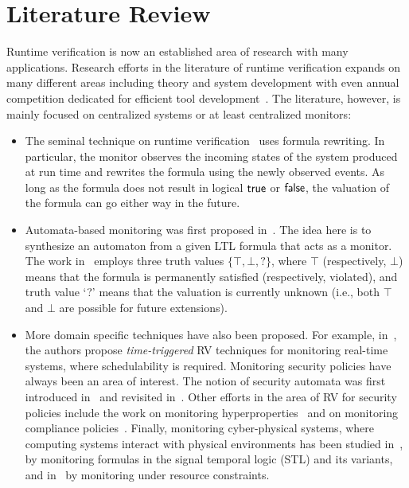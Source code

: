 \chapter{Literature Review}
\label{chap:RW}

Runtime verification is now an established area of research with many 
applications. Research efforts in the literature of runtime verification 
expands on many different areas including theory and system development 
with even annual competition dedicated for efficient tool 
development~\cite{sttt-rv}. The literature, however, is mainly focused on 
centralized systems or at least centralized monitors:

\begin{itemize}
 \item The seminal technique on runtime 
verification~\cite{hr01,hr01a,hr04,ar05,cr07,hr02} uses formula rewriting. In 
particular, the monitor observes the incoming states of the system produced at 
run time and rewrites the formula using the newly observed events. As long as 
the formula does not result in logical $\mathsf{true}$ or $\mathsf{false}$, the valuation of the 
formula can go either way in the future.

\item Automata-based monitoring was first proposed in~\cite{bls11}. The idea 
here is to synthesize an automaton from a given LTL formula that acts as a 
monitor. The work in~\cite{bls11} employs three truth values $\{\top, \bot, 
?\}$, where $\top$ (respectively, $\bot$) means that the formula is permanently 
satisfied (respectively, violated), and truth value `?' means that the 
valuation is currently unknown (i.e., both $\top$ and $\bot$ are possible for 
future extensions).

\item More domain specific techniques have also been proposed. For example, 
in~\cite{bnf11,nwbf11,nbf15,bnf13}, the authors propose {\em time-triggered} RV 
techniques for monitoring real-time systems, where schedulability is required. 
Monitoring security policies have always been an area of interest. The notion 
of security automata was first introduced in~\cite{s00} and revisited 
in~\cite{bjkz13}. Other efforts in the area of RV for security policies include 
the work on monitoring hyperproperties~\cite{ab16,bsb17,fhst17} and on 
monitoring compliance policies~\cite{DBLP:journals/fmsd/BasinCEHKM16}. Finally, 
monitoring cyber-physical systems, where computing systems interact with 
physical environments has been studied 
in~\cite{nkjdj17,DBLP:conf/rv/DeshmukhDGJJS15}, by monitoring formulas in 
the signal temporal logic (STL) and its variants, and in~\cite{mbfk15} by 
monitoring under resource constraints.

\end{itemize}

